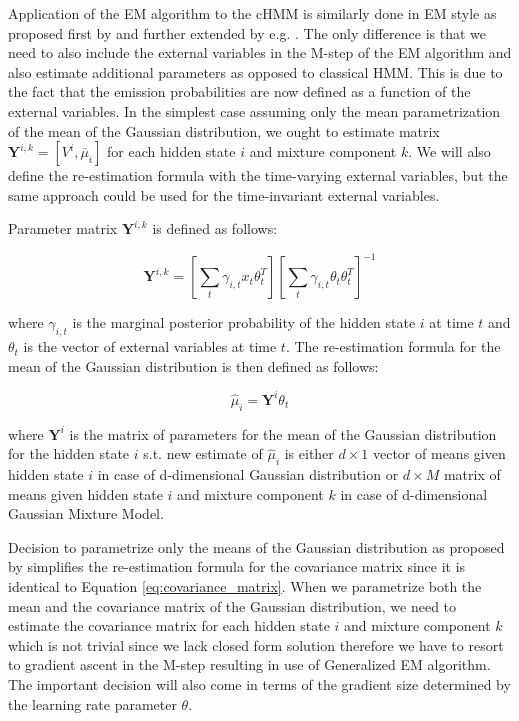 Application of the EM algorithm to the cHMM is similarly done in EM style as proposed first by \citep{Bobick1999} and further extended by e.g. \citep{Radenen2014}. 
The only difference is that we need to also include the external variables in the 
M-step of the EM algorithm and also estimate additional parameters as opposed to classical HMM. This is due to the fact that the emission probabilities
are now defined as a function of the external variables. In the simplest case assuming only the mean parametrization of the mean of the Gaussian distribution,
we ought to estimate matrix $\textbf{Y}^{i,k} = [V^i,\bar{\mu}_i]$ for each hidden state $i$ and mixture component $k$. We will also define the re-estimation formula 
with the time-varying external variables, but the same approach could be used for the time-invariant external variables. \citep{Radenen2014}

Parameter matrix $\textbf{Y}^{i,k}$ is defined as follows:

\begin{equation}
    \textbf{Y}^{i,k} = \left[\sum_{t} \gamma_{i,t} x_t \theta_t^T\right] \left[ \sum_{t} \gamma_{i,t} \theta_t \theta_t^T \right]^{-1}
\end{equation}

where $\gamma_{i,t}$ is the marginal posterior probability of the hidden state $i$ at time $t$ and $\theta_t$ is the vector of external variables at time $t$.
The re-estimation formula for the mean of the Gaussian distribution is then defined as follows:

\begin{equation}
    \hat{\mu}_i = \textbf{Y}^{i} \theta_t
\end{equation}

where $\textbf{Y}^{i}$ is the matrix of parameters for the mean of the Gaussian distribution for the hidden state $i$ s.t. 
new estimate of $\hat{\mu}_i$ is either $d \times 1$ vector of means given hidden state $i$ in case of d-dimensional Gaussian distribution or
$d \times M$ matrix of means given hidden state $i$ and mixture component $k$ in case of d-dimensional Gaussian Mixture Model.

Decision to parametrize only the means of the Gaussian distribution as proposed by \citep{Bobick1999} simplifies the re-estimation formula for the covariance matrix 
since it is identical to Equation \ref{eq:covariance_matrix}. When we parametrize both the mean and the covariance matrix of the Gaussian distribution,
we need to estimate the covariance matrix for each hidden state $i$ and mixture component $k$ which is not trivial since 
we lack closed form solution therefore we have to resort to gradient ascent in the M-step resulting in use of Generalized EM algorithm. 
The important decision will also come in terms of the gradient size determined by the learning rate parameter $\theta$. \citep{Radenen2014}

